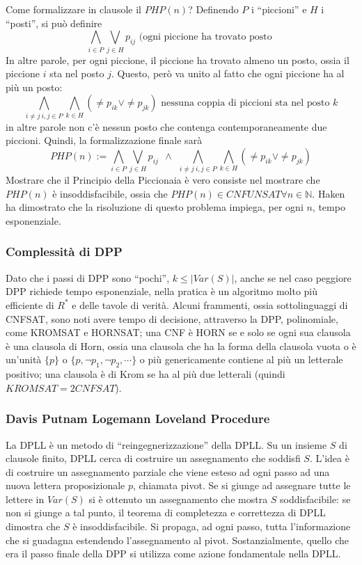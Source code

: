 Come formalizzare in clausole il $PHP(n)$? Definendo $P$ i ``piccioni'' e 
$H$ i ``posti'', si può definire
$$
\bigwedge_{i \in P} \bigvee_{j \in H} p_{ij} \text{ (ogni piccione ha trovato posto }
$$
In altre parole, per ogni piccione, il piccione ha trovato almeno un posto, 
ossia il piccione $i$ sta nel posto $j$. 
Questo, però va unito al fatto che ogni piccione ha al più un posto: 
$$
\bigwedge_{i \neq j ~ i,j \in P}\bigwedge_{k \in H} (\neq p_{ik} \lor \neq p_{jk}) \text{ nessuna coppia di piccioni 
sta nel posto }k 
$$
in altre parole non c'è nessun posto che contenga contemporaneamente due piccioni. 
Quindi, la formalizzazione finale sarà 
$$
PHP(n) := \bigwedge_{i \in P} \bigvee_{j \in H} p_{ij} ~~ \land ~~ \bigwedge_{i \neq j ~ i,j \in P}\bigwedge_{k \in H} (\neq p_{ik} \lor \neq p_{jk})
$$
Mostrare che il Principio della Piccionaia è vero consiste nel mostrare che 
$PHP(n)$ è insoddisfacibile, ossia che $PHP(n) \in CNFUNSAT \forall n \in \mathbb{N}$. 
Haken ha dimostrato che la risoluzione di questo problema impiega, per ogni $n$, 
tempo esponenziale. 


\subsubsection{Complessità di DPP}
Dato che i passi di DPP sono ``pochi'', $k \leq |Var(S)|$, anche se nel caso 
peggiore DPP richiede tempo esponenziale, nella pratica è un 
algoritmo molto più efficiente di $R^*$ e delle tavole di verità. 
Alcuni frammenti, ossia sottolinguaggi di CNFSAT, sono noti avere tempo di 
decisione, attraverso la DPP, polinomiale, come KROMSAT e HORNSAT; 
una CNF è HORN se e solo se ogni sua clausola è una clausola di Horn, ossia 
una clausola che ha la forma della clausola vuota o è un'unità $\{p\}$ o 
$\{p, \neg p_1, \neg p_2, \cdots\}$ o più genericamente contiene al più un 
letterale positivo; una clausola è di Krom se ha al più due letterali 
(quindi $KROMSAT = 2CNFSAT$). 

\subsubsection{Davis Putnam Logemann Loveland Procedure}
La DPLL è un metodo di ``reingegnerizzazione'' della DPLL. Su un insieme $S$ di 
clausole finito, DPLL cerca di costruire un assegnamento che soddisfi $S$. 
L'idea è di costruire un assegnamento parziale che viene esteso ad ogni passo 
ad una nuova lettera proposizionale $p$, chiamata pivot. Se si giunge ad assegnare 
tutte le lettere in $Var(S)$ si è ottenuto un assegnamento che mostra $S$ soddisfacibile: 
se non si giunge a tal punto, il teorema di completezza e correttezza di DPLL 
dimostra che $S$ è insoddisfacibile. Si propaga, ad ogni passo, tutta l'informazione 
che si guadagna estendendo l'assegnamento al pivot. Sostanzialmente, quello che era 
il passo finale della DPP si utilizza come azione fondamentale nella DPLL. 

